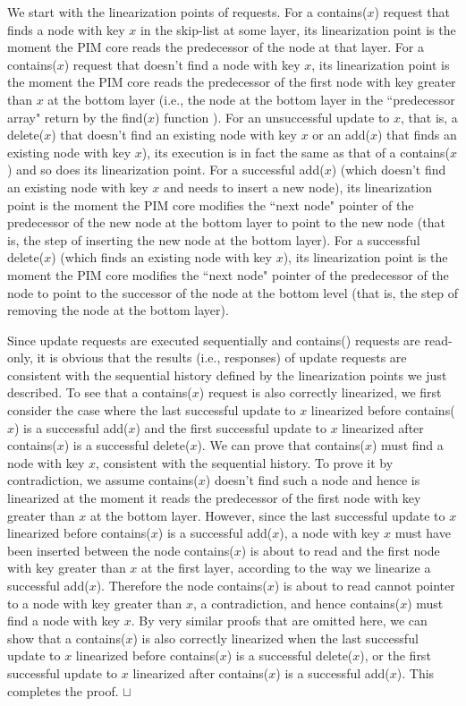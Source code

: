 \documentclass[11pt, letterpaper]{article}   	%
\newcommand{\sq}{\hbox{\rlap{$\sqcap$}$\sqcup$}}
\newcommand{\qed}{\hspace*{\fill}\sq}
\begin{document}
We start with the linearization points of requests. 
For a contains($x$) request that finds a node with key $x$ in the skip-list at some layer, 
its linearization point is the moment the PIM core reads the predecessor of the node at that layer. 
For a contains($x$) request that doesn't find a node with key $x$, its linearization point is the moment 
the PIM core reads the predecessor of the first node with key greater than $x$ at the bottom layer 
(i.e., the node at the bottom layer in the ``predecessor array" return by the find($x$) function \cite{Herlihy08}). 
For an unsuccessful update to $x$, that is, a delete($x$) that doesn't find an existing node with key $x$ 
or an add($x$) that finds an existing node with key $x$), 
its execution is in fact the same as that of a contains($x$) and so does its linearization point. 
For a successful add($x$) (which doesn't find an existing node with key $x$ and needs to insert a new node), 
its linearization point is the moment the PIM core modifies the ``next node" pointer of the predecessor 
of the new node at the bottom layer to point to the new node 
(that is, the step of inserting the new node at the bottom layer).  
For a successful delete($x$) (which finds an existing node with key $x$), its linearization point is 
the moment the PIM core modifies the ``next node" pointer of the predecessor of the node to point to 
the successor of the node at the bottom level (that is, the step of removing the node at the bottom layer). 

Since update requests are executed sequentially and contains() requests are read-only, 
it is obvious that the results (i.e., responses) of update requests are consistent 
with the sequential history defined by the linearization points we just described. 
To see that a contains($x$) request is also correctly linearized, we first consider the case where 
the last successful update to $x$ linearized before contains($x$) is a successful add($x$) and 
the first successful update to $x$ linearized after contains($x$) is a successful delete($x$). 
We can prove that contains($x$) must find a node with key $x$, consistent with the sequential history. 
To prove it by contradiction, we assume contains($x$) doesn't find such a node and hence is linearized 
at the moment it reads the predecessor of the first node with key greater than $x$ at the bottom layer. 
However, since the last successful update to $x$ linearized before contains($x$) is a successful add($x$), 
a node with key $x$ must have been inserted between the node contains($x$) is about to read and the first 
node with key greater than $x$ at the first layer, according to the way we linearize a successful add($x$). 
Therefore the node contains($x$) is about to read cannot pointer to a node with key greater than $x$, 
a contradiction, and hence contains($x$) must find a node with key $x$. 
By very similar proofs that are omitted here, we can show that a contains($x$) is also correctly linearized 
when the last successful update to $x$ linearized before contains($x$) is a successful delete($x$), or
the first successful update to $x$ linearized after contains($x$) is a successful add($x$). 
This completes the proof. 
\qed
\end{document}

